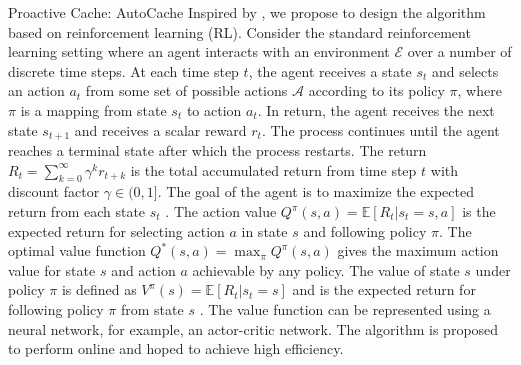 \documentclass{article}
\begin{document}
\begin{section}{Proactive Cache: AutoCache}
    Inspired by \cite{Pensieve}, we propose to design the algorithm based on reinforcement learning (RL). Consider the standard reinforcement learning setting where an agent interacts with an environment $\mathcal{E}$ over a number of discrete time steps. At each time step $t$, the agent receives a state $s_t$ and selects an action $a_t$ from some set of possible actions $\mathcal{A}$ according to its policy $\pi$, where $\pi$ is a mapping from state $s_t$ to action $a_t$. In return, the agent receives the next state $s_{t+1}$ and receives a scalar reward $r_t$. The process continues until the agent reaches a terminal state after which the process restarts. The return $R_t=\sum_{k=0}^{\infty}\gamma^k r_{t+k}$ is the total accumulated return from time step $t$ with discount factor $\gamma\in(0,1]$. The goal of the agent is to maximize the expected return from each state $s_t$ \cite{rl-intro}. The action value $Q^{\pi}(s,a)=\mathbb{E}[R_t|s_t=s,a]$ is the expected return for selecting action $a$ in state $s$ and following policy $\pi$. The optimal value function $Q^*(s,a)=\max_{\pi}Q^{\pi}(s,a)$ gives the maximum action value for state $s$ and action $a$ achievable by any policy. The value of state $s$ under policy $\pi$ is defined as $V^{\pi}(s)=\mathbb{E}[R_t|s_t=s]$ and is the expected return for following policy $\pi$ from state $s$ \cite{DBLP:journals/corr/MnihBMGLHSK16}. The value function can be represented using a neural network, for example, an actor-critic network. The algorithm is proposed to perform online and hoped to achieve high efficiency.
\end{section}
\end{document}
